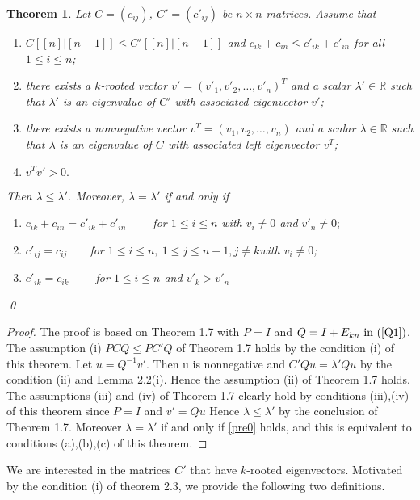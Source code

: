 \documentclass[12pt]{report}%
\theoremstyle{plain}
\newtheorem{thm}{Theorem}[chapter]
\theoremstyle{definition}
\begin{document}
\begin{thm} \label{thm_main}
    Let $C=(c_{ij})$, $C'=(c'_{ij})$ be  $n\times n$ matrices.
Assume that
\begin{enumerate}
\item[(i)]   $C[[n]|[n-1]]\leq C'[[n]|[n-1]]$ and $c_{ik}+c_{in}\leq c'_{ik}+c'_{in}$ for all $1\leq i\leq n$;
\item[(ii)] there exists a $k$-rooted vector $v'=(v'_1, v'_2, \ldots, v'_n)^T$ and a scalar $\lambda'\in \mathbb{R}$
such that $\lambda'$ is an eigenvalue of $C'$ with associated eigenvector $v'$;
\item[(iii)] there exists a nonnegative vector $v^T=(v_1, v_2, \ldots, v_n)$ and a scalar $\lambda\in \mathbb{R}$ such that $\lambda$ is an eigenvalue of $C$ with associated left eigenvector $v^T$;
\item[(iv)] $v^Tv'>0.$
\end{enumerate}
 Then $\lambda\leq \lambda'$.
Moreover, $\lambda=\lambda'$
if and only if
\begin{enumerate}
\item[(a)]    $c_{ik}+c_{in}=c'_{ik}+c'_{in} \qquad$  for $1\leq i\leq n$ with $v_i\not=0$ and $v'_n\not=0;$
\item[(b)]  $c'_{ij}=c_{ij}\qquad $for $1\leq i\leq n,~1\leq j\leq n-1, j \neq k $with $v_i\ne 0 $;
\item[(c)]   $c'_{ik}=c_{ik} \qquad $  for $1\leq i \leq n$ and $ v'_{k}>v'_n$ 
\end{enumerate} \qed


\end{thm}

\begin{proof}
The proof is based on Theorem 1.7 with $P = I$ and $Q = I + E_{kn} \text{ in } (\ref{Q1} )  $. The assumption (i) $PCQ\leq PC'Q$ of Theorem 1.7 holds by the condition (i) of this theorem. Let $u = Q^{-1}v'$. Then u is nonnegative and $C'Qu = \lambda' Qu$ by the condition (ii) and Lemma 2.2(i). Hence the assumption (ii) of Theorem 1.7 holds. The assumptions (iii) and (iv) of Theorem 1.7 clearly hold by conditions (iii),(iv) of this theorem since $P = I$ and $v'= Qu$  Hence $\lambda \leq \lambda' $ by the conclusion of Theorem 1.7. Moreover $\lambda = \lambda'$ if and only if \ref{pre0} holds, and this is equivalent to conditions (a),(b),(c) of this theorem. 
\end{proof}

We are interested in the matrices $C'$ that have $k$-rooted eigenvectors.
Motivated by the condition (i) of theorem 2.3, we provide the following two definitions. 
\end{document}

